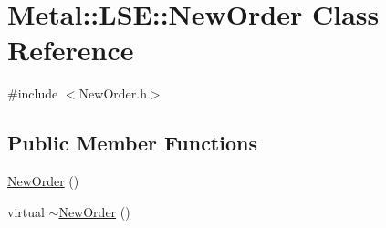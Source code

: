 \hypertarget{classMetal_1_1LSE_1_1NewOrder}{}\section{Metal\+:\+:L\+S\+E\+:\+:New\+Order Class Reference}
\label{classMetal_1_1LSE_1_1NewOrder}


{\ttfamily \#include $<$New\+Order.\+h$>$}

\subsection*{Public Member Functions}
\begin{DoxyCompactItemize}
\item 
\hyperlink{classMetal_1_1LSE_1_1NewOrder_aeaedaf6e5ebd46fbb1448b95c2791dcd}{New\+Order} ()
\item 
virtual \hyperlink{classMetal_1_1LSE_1_1NewOrder_acf2c36880aedda0edef97616a8d002fd}{$\sim$\+New\+Order} ()
\end{DoxyCompactItemize}

